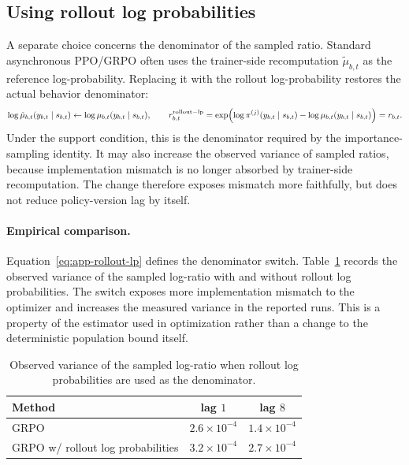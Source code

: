\subsection{Using rollout log probabilities}
\label{app:rollout-lp}

A separate choice concerns the denominator of the sampled ratio. Standard asynchronous PPO/GRPO often uses the trainer-side recomputation $\tilde\mu_{b,t}$ as the reference log-probability. Replacing it with the rollout log-probability restores the actual behavior denominator:
\begin{equation}
\log\tilde\mu_{b,t}(y_{b,t}\mid s_{b,t})\leftarrow \log\mu_{b,t}(y_{b,t}\mid s_{b,t}),
\qquad
r_{b,t}^{\mathrm{rollout-lp}}
=\exp\Bigl(\log\pi^{(j)}(y_{b,t}\mid s_{b,t})-\log\mu_{b,t}(y_{b,t}\mid s_{b,t})\Bigr)=r_{b,t}.
\label{eq:app-rollout-lp}
\end{equation}
Under the support condition, this is the denominator required by the importance-sampling identity. It may also increase the observed variance of sampled ratios, because implementation mismatch is no longer absorbed by trainer-side recomputation. The change therefore exposes mismatch more faithfully, but does not reduce policy-version lag by itself.

\paragraph{Empirical comparison.}
Equation~\eqref{eq:app-rollout-lp} defines the denominator switch. Table~\ref{tab:app-exp-rolloutlp} records the observed variance of the sampled log-ratio with and without rollout log probabilities. The switch exposes more implementation mismatch to the optimizer and increases the measured variance in the reported runs. This is a property of the estimator used in optimization rather than a change to the deterministic population bound itself.

\begin{table}[h]
\centering
\caption{Observed variance of the sampled log-ratio when rollout log probabilities are used as the denominator.}
\label{tab:app-exp-rolloutlp}
\small
\begin{tabular}{@{}lcc@{}}
\toprule
Method & lag $1$ & lag $8$ \\
\midrule
GRPO & $2.6\times 10^{-4}$ & $1.4\times 10^{-4}$ \\
GRPO w/ rollout log probabilities & $3.2\times 10^{-4}$ & $2.7\times 10^{-4}$ \\
\bottomrule
\end{tabular}
\end{table}

